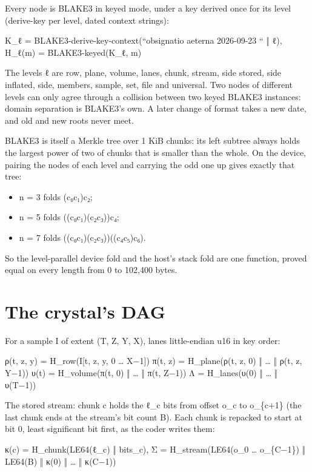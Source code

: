 Every node is BLAKE3 in keyed mode, under a key derived once for its level (derive-key per level, dated context strings):

K\_\allowbreak{}ℓ = BLAKE3-derive-key-context(“obsignatio aeterna 2026-09-23 “ ‖ ℓ),  H\_\allowbreak{}ℓ(m) = BLAKE3-keyed(K\_\allowbreak{}ℓ, m)

The levels ℓ are row, plane, volume, lanes, chunk, stream, side stored, side inflated, side, members, sample, set, file and universal. Two nodes of different levels can only agree through a collision between two keyed BLAKE3 instances: domain separation is BLAKE3's own. A later change of format takes a new date, and old and new roots never meet.

BLAKE3 is itself a Merkle tree over 1 KiB chunks: its left subtree always holds the largest power of two of chunks that is smaller than the whole. On the device, pairing the nodes of each level and carrying the odd one up gives exactly that tree:

\begin{itemize}
\item n = 3 folds (c₀c₁)c₂;
\item n = 5 folds ((c₀c₁)(c₂c₃))c₄;
\item n = 7 folds ((c₀c₁)(c₂c₃))((c₄c₅)c₆).
\end{itemize}

So the level-parallel device fold and the host's stack fold are one function, proved equal on every length from 0 to 102,400 bytes.

\section{\texorpdfstring{The crystal's DAG}{The crystal's DAG}}

For a sample I of extent (T, Z, Y, X), lanes little-endian u16 in key order:

ρ(t, z, y) = H\_\allowbreak{}row(I[t, z, y, 0 … X−1]) π(t, z) = H\_\allowbreak{}plane(ρ(t, z, 0) ‖ … ‖ ρ(t, z, Y−1)) υ(t) = H\_\allowbreak{}volume(π(t, 0) ‖ … ‖ π(t, Z−1)) Λ = H\_\allowbreak{}lanes(υ(0) ‖ … ‖ υ(T−1))

The stored stream: chunk c holds the ℓ\_\allowbreak{}c bits from offset o\_\allowbreak{}c to o\_\allowbreak{}\{c+1\} (the last chunk ends at the stream's bit count B). Each chunk is repacked to start at bit 0, least significant bit first, as the coder writes them:

κ(c) = H\_\allowbreak{}chunk(LE64(ℓ\_\allowbreak{}c) ‖ bits\_\allowbreak{}c),  Σ = H\_\allowbreak{}stream(LE64(o\_\allowbreak{}0 … o\_\allowbreak{}\{C−1\}) ‖ LE64(B) ‖ κ(0) ‖ … ‖ κ(C−1))

